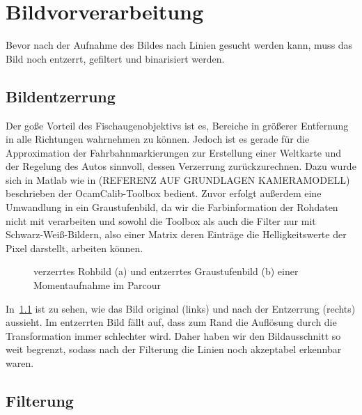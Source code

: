 \chapter{Bildvorverarbeitung}

Bevor nach der Aufnahme des Bildes nach Linien gesucht werden kann, muss das Bild noch entzerrt, gefiltert und binarisiert werden. 

\section{Bildentzerrung}

Der goße Vorteil des Fischaugenobjektivs ist es, Bereiche in größerer Entfernung in alle Richtungen  wahrnehmen zu können. Jedoch ist es gerade für die Approximation der Fahrbahnmarkierungen zur Erstellung einer Weltkarte und der Regelung des Autos sinnvoll, dessen Verzerrung zurückzurechnen. Dazu wurde sich in Matlab wie in (REFERENZ AUF GRUNDLAGEN KAMERAMODELL) beschrieben der OcamCalib-Toolbox bedient. Zuvor erfolgt außerdem eine Umwandlung in ein Graustufenbild, da wir die Farbinformation der Rohdaten nicht mit verarbeiten und sowohl die Toolbox als auch die Filter nur mit Schwarz-Weiß-Bildern, also einer Matrix deren Einträge die Helligkeitswerte der Pixel darstellt, arbeiten können. 

\begin{figure}[ht] %
  \centering
  \qquad
  \caption{verzerrtes Rohbild (a) und entzerrtes Graustufenbild (b) einer Momentaufnahme im Parcour}
\label{fig:bildvorverarbeitung_entzerren}
\end{figure} 

In~\ref{fig:bildvorverarbeitung_entzerren} ist zu sehen, wie das Bild original (links) und nach der Entzerrung (rechts) aussieht. Im entzerrten Bild fällt auf, dass zum Rand die Auflösung durch die Transformation immer schlechter wird. Daher haben wir den Bildausschnitt so weit begrenzt, sodass nach der Filterung die Linien noch akzeptabel erkennbar waren.

\section{Filterung}

